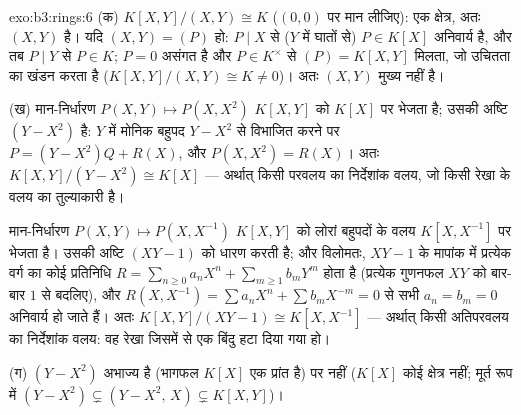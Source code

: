 \begin{solution}{exo:b3:rings:6}
(क) $K[X,Y]/(X,Y) \cong K$ ($(0,0)$ पर मान लीजिए): एक क्षेत्र, अतः $(X,Y)$  है।
यदि $(X, Y) = (P)$ हो: $P \mid X$ से ($Y$ में घातों से) $P \in K[X]$ अनिवार्य है, और
तब $P \mid Y$ से $P \in K$; $P =
0$ असंगत है और $P \in K^\times$ से $(P) = K[X,Y]$ मिलता, जो
उचितता का खंडन करता है ($K[X,Y]/(X,Y) \cong K \neq 0$)। अतः $(X,Y)$ मुख्य नहीं है।

(ख) मान-निर्धारण $P(X, Y) \mapsto P(X, X^2)$ $K[X,Y]$ को $K[X]$ पर भेजता है; उसकी अष्टि $(Y - X^2)$
है: $Y$ में मोनिक बहुपद $Y - X^2$ से विभाजित करने पर $P = (Y - X^2)Q + R(X)$, और
$P(X, X^2) =
R(X)$। अतः $K[X,Y]/(Y - X^2) \cong K[X]$ --- अर्थात् किसी परवलय का निर्देशांक वलय, जो किसी
रेखा के वलय का तुल्याकारी है।

मान-निर्धारण $P(X, Y) \mapsto P(X, X^{-1})$ $K[X, Y]$ को लोरां बहुपदों के वलय $K[X, X^{-1}]$ पर भेजता
है। उसकी अष्टि $(XY - 1)$ को धारण करती है; और विलोमतः, $XY - 1$ के मापांक
में प्रत्येक वर्ग का कोई प्रतिनिधि $R = \sum_{n \geq 0} a_nX^n + \sum_{m \geq 1} b_m
Y^m$ होता है (प्रत्येक गुणनफल
$XY$ को बार-बार $1$ से बदलिए), और $R(X,
X^{-1}) = \sum a_n X^n + \sum b_m X^{-m} = 0$ से सभी $a_n =
b_m = 0$ अनिवार्य हो
जाते हैं। अतः $K[X, Y]/(XY - 1) \cong K[X, X^{-1}]$ --- अर्थात् किसी अतिपरवलय का निर्देशांक वलय: वह
रेखा जिसमें से एक बिंदु हटा दिया गया हो।

(ग) $(Y - X^2)$ अभाज्य है (भागफल $K[X]$ एक प्रांत है) पर  नहीं
($K[X]$ कोई क्षेत्र नहीं; मूर्त रूप में $(Y - X^2) \subsetneq
(Y - X^2,\, X) \subsetneq K[X,Y]$)।
\end{solution}


